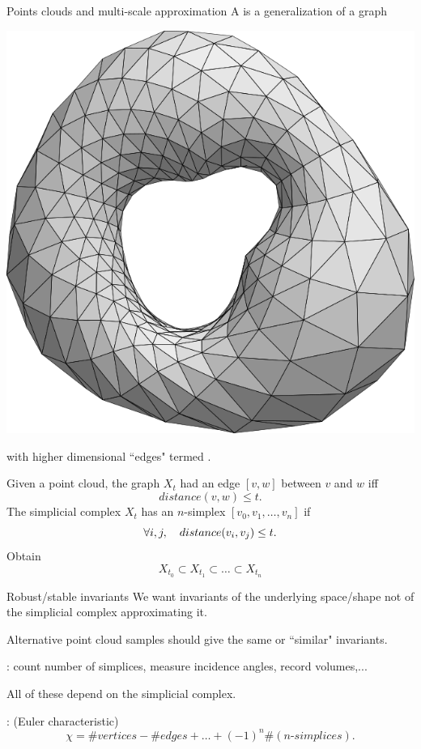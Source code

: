 \begin{frame}{Points clouds and multi-scale approximation}
	\pause
	A  is a generalization of a graph
	\begin{center}
		\includegraphics[scale=.1]{aux/torus_triangulated}
	\end{center}
	with higher dimensional ``edges" termed .

	\medskip\pause
	Given a point cloud, the graph $X_t$ had an edge $[v,w]$ between $v$ and $w$ iff
	\[
	distance(v,w) \leq t.
	\]
	\pause
	The simplicial complex $X_t$ has an $n$-simplex $[v_0,v_1,\dots,v_n]$ if
	\[
	\forall i,j, \quad distance(v_i,v_j) \leq t.
	\vspace*{-5pt}
	\]
	\vspace*{-5pt}\pause
	Obtain 
	\[
	X_{t_0} \subset X_{t_1} \subset\dots\subset X_{t_n}
	\]
\end{frame}

\begin{frame}{Robust/stable invariants}
	\pause
	We want invariants of the underlying space/shape not of the simplicial complex approximating it.

	\medskip
	 Alternative point cloud samples should give the same or ``similar" invariants.

	\pause\medskip
	: count number of simplices, measure incidence angles, record volumes,...

	\medskip
	All of these depend on the simplicial complex.

	\pause\medskip
	: (Euler characteristic)
	\[
	\chi = \# vertices - \# edges + \dots + (-1)^n \#(n\text{-}simplices).
	\]
\end{frame}

